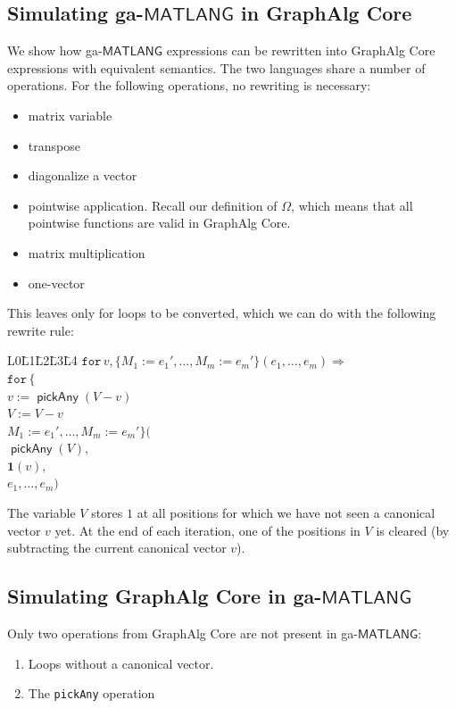 \documentclass{article}
\newcommand\graphalg{\textsf{GraphAlg}}
\DeclareMathOperator{\pickAny}{\mathsf{pickAny}}
\newcommand{\ML}{\mathsf{MATLANG}}
\newcommand{\rowdom}{\mathbf{1}}
\newcommand{\one}{\rowdom}
\begin{document}
\subsection{Simulating ga-$\ML$ in \graphalg{} Core}
We show how ga-$\ML$ expressions can be rewritten into \graphalg{} Core expressions with equivalent semantics.
The two languages share a number of operations. For the following operations, no rewriting is necessary:
\begin{itemize}
    \item matrix variable
    \item transpose
    \item diagonalize a vector
    \item pointwise application.
          Recall our definition of $\Omega$, which means that all pointwise functions are valid in \graphalg{} Core.
    \item matrix multiplication
    \item one-vector
\end{itemize}

This leaves only for loops to be converted, which we can do with the following rewrite rule:

\begin{tabbing}
    L0\=L1\=L2\=L3\=L4 \kill
    $\texttt{for}\, v,\{ M_1 := e_1', \ldots, M_m := e_m' \}(e_1, \ldots, e_m) \Rightarrow$ \\
    $\texttt{for}\, \{$ \\
    \>$v := \pickAny(V - v)$ \\
    \>$V := V - v$ \\
    \>$ M_1 := e_1', \ldots, M_m := e_m' \}($\\
    \>$\pickAny(V),$\\
    \>$\one(v),$\\
    \>$e_1, \ldots, e_m)$ \\
\end{tabbing}

The variable $V$ stores $1$ at all positions for which we have not seen a canonical vector $v$ yet.
At the end of each iteration, one of the positions in $V$ is cleared (by subtracting the current canonical vector $v$).

\subsection{Simulating \graphalg{} Core in ga-$\ML$}
Only two operations from \graphalg{} Core are not present in ga-$\ML$:
\begin{enumerate}
    \item Loops without a canonical vector.
    \item The \texttt{pickAny} operation
\end{enumerate}
\end{document}
